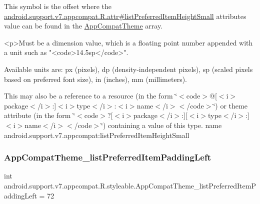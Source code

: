 This symbol is the offset where the \hyperlink{classandroid_1_1support_1_1v7_1_1appcompat_1_1R_1_1attr_a7c60f3752499ca7d45fa41451e0de852}{android.\+support.\+v7.\+appcompat.\+R.\+attr\#list\+Preferred\+Item\+Height\+Small} attribute\textquotesingle{}s value can be found in the \hyperlink{classandroid_1_1support_1_1v7_1_1appcompat_1_1R_1_1styleable_a5c42f89e8a410c323be34208d75c430b}{App\+Compat\+Theme} array.

\begin{DoxyVerb}      <p>Must be a dimension value, which is a floating point number appended with a unit such as "<code>14.5sp</code>".
\end{DoxyVerb}
 Available units are\+: px (pixels), dp (density-\/independent pixels), sp (scaled pixels based on preferred font size), in (inches), mm (millimeters). 

This may also be a reference to a resource (in the form \char`\"{}$<$code$>$@\mbox{[}$<$i$>$package$<$/i$>$\+:\mbox{]}$<$i$>$type$<$/i$>$\+:$<$i$>$name$<$/i$>$$<$/code$>$\char`\"{}) or theme attribute (in the form \char`\"{}$<$code$>$?\mbox{[}$<$i$>$package$<$/i$>$\+:\mbox{]}\mbox{[}$<$i$>$type$<$/i$>$\+:\mbox{]}$<$i$>$name$<$/i$>$$<$/code$>$\char`\"{}) containing a value of this type.  name android.\+support.\+v7.\+appcompat\+:list\+Preferred\+Item\+Height\+Small \mbox{\label{classandroid_1_1support_1_1v7_1_1appcompat_1_1R_1_1styleable_a69a77a880e875071ddde0553b2220450}} 
\subsubsection{\texorpdfstring{App\+Compat\+Theme\+\_\+list\+Preferred\+Item\+Padding\+Left}{AppCompatTheme\_listPreferredItemPaddingLeft}}
{\footnotesize\ttfamily int android.\+support.\+v7.\+appcompat.\+R.\+styleable.\+App\+Compat\+Theme\+\_\+list\+Preferred\+Item\+Padding\+Left = 72\hspace{0.3cm}{\ttfamily [static]}}

